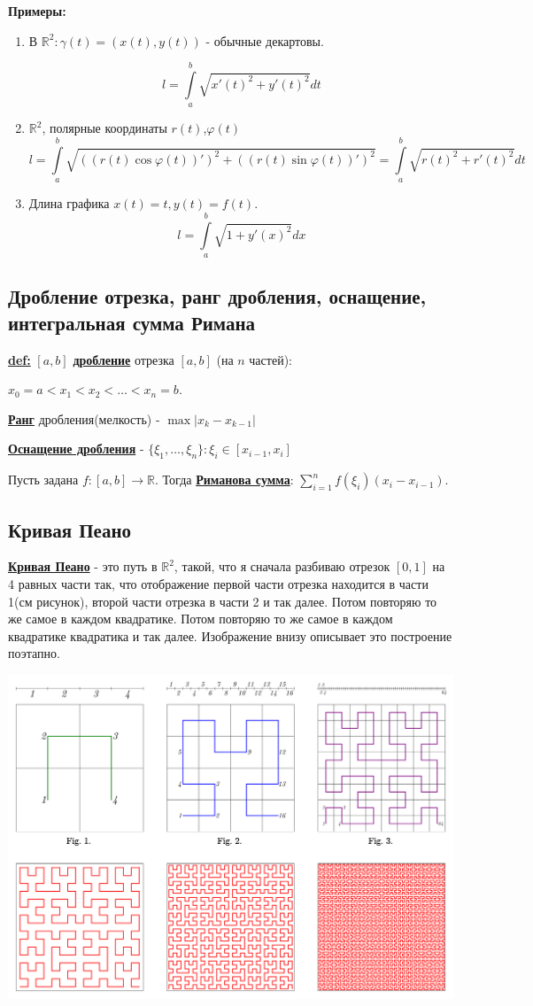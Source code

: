 \documentclass{article}
\newcommand{\R}{\mathbb{R}}
\newcommand{\integral}[2]{\displaystyle\int\limits_{#1}^{#2}}
\newcommand{\deff}[1]{\underline{\textbf{#1}}}
\begin{document}
\textbf{Примеры:}
\begin{enumerate}
    \item В $\mathbb{R}^2:\gamma(t) = (x(t),y(t))$ - обычные декартовы.

    $$l = \integral{a}{b}\sqrt{x'(t)^2+y'(t)^2} dt$$
    \item $\mathbb{R}^2$, полярные координаты $r(t)$,$\varphi(t)$
    $$l = \integral{a}{b} \sqrt{((r(t) \cos \varphi(t))')^2+((r(t) \sin\varphi(t))')^2} = \integral{a}{b} \sqrt{r(t)^2+r'(t)^2}dt$$
    \item Длина графика $x(t) =t, y(t) = f(t)$. 
    $$l = \integral{a}{b}\sqrt{1 + y'(x)^2}dx$$
\end{enumerate}


\subsection{Дробление отрезка, ранг дробления, оснащение, интегральная сумма Римана}

\deff{def:} $[a,b]$ \deff{дробление} отрезка $[a,b]$ (на $n$ частей):

$x_0 = a <x_1<x_2<\ldots <x_n=b$.

\deff{Ранг} дробления(мелкость) - $\max |x_k-x_{k-1}|$

\deff{Оснащение дробления} - $\{\xi_1,\ldots, \xi_n\}: \xi_i \in [x_{i-1},x_i]$

Пусть задана $f:[a,b] \rightarrow \R$. Тогда \deff{Риманова сумма}: $\sum\limits_{i=1}^n f(\xi_i)(x_i-x_{i-1})$.


\subsection{Кривая Пеано}

\deff{Кривая Пеано} - это путь в $\R^2$, такой, что я сначала разбиваю отрезок $[0,1]$ на 4 равных части так, что отображение первой части отрезка находится в части 1(см рисунок), второй части отрезка в части 2 и так далее. Потом повторяю то же самое в каждом квадратике. Потом повторяю то же самое в каждом квадратике квадратика и так далее. Изображение внизу описывает это построение поэтапно.

\begin{center}
   \includegraphics[width = 15 cm]{assets/integral_hilbert_curve.svg.png}
\end{center}
\end{document}
